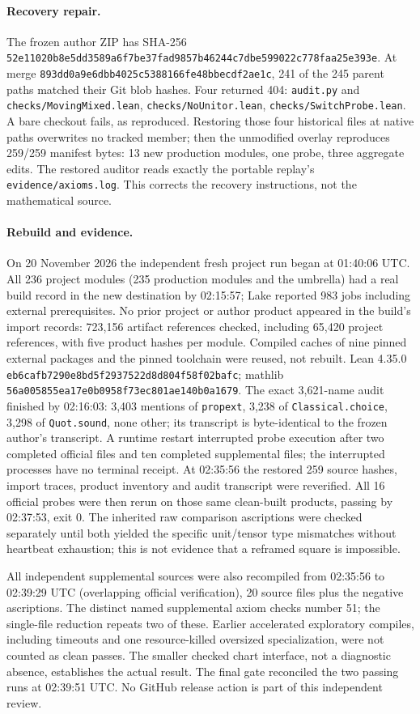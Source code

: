 \documentclass[10pt]{article}
\newcommand{\code}{\nolinkurl}\setlength{\emergencystretch}{3em}
\begin{document}
\paragraph{Recovery repair.} The frozen author ZIP has SHA-256 \code{52e11020b8e5dd3589a6f7be37fad9857b46244c7dbe599022c778faa25e393e}. At merge \code{893dd0a9e6dbb4025c5388166fe48bbecdf2ae1c}, 241 of the 245 parent paths matched their Git blob hashes. Four returned 404: \code{audit.py} and \code{checks/MovingMixed.lean}, \code{checks/NoUnitor.lean}, \code{checks/SwitchProbe.lean}. A bare checkout fails, as reproduced. Restoring those four historical files at native paths overwrites no tracked member; then the unmodified overlay reproduces 259/259 manifest bytes: 13 new production modules, one probe, three aggregate edits. The restored auditor reads exactly the portable replay's \code{evidence/axioms.log}. This corrects the recovery instructions, not the mathematical source.
\paragraph{Rebuild and evidence.} On 20 November 2026 the independent fresh project run began at 01:40:06 UTC. All 236 project modules (235 production modules and the umbrella) had a real build record in the new destination by 02:15:57; Lake reported 983 jobs including external prerequisites. No prior project or author product appeared in the build's import records: 723,156 artifact references checked, including 65,420 project references, with five product hashes per module. Compiled caches of nine pinned external packages and the pinned toolchain were reused, not rebuilt. Lean 4.35.0 \code{eb6cafb7290e8bd5f2937522d8d804f58f02bafc}; mathlib \code{56a005855ea17e0b0958f73ec801ae140b0a1679}. The exact 3,621-name audit finished by 02:16:03: 3,403 mentions of \code{propext}, 3,238 of \code{Classical.choice}, 3,298 of \code{Quot.sound}, none other; its transcript is byte-identical to the frozen author's transcript. A runtime restart interrupted probe execution after two completed official files and ten completed supplemental files; the interrupted processes have no terminal receipt. At 02:35:56 the restored 259 source hashes, import traces, product inventory and audit transcript were reverified. All 16 official probes were then rerun on those same clean-built products, passing by 02:37:53, exit 0. The inherited raw comparison ascriptions were checked separately until both yielded the specific unit/tensor type mismatches without heartbeat exhaustion; this is not evidence that a reframed square is impossible.
\par All independent supplemental sources were also recompiled from 02:35:56 to 02:39:29 UTC (overlapping official verification), 20 source files plus the negative ascriptions. The distinct named supplemental axiom checks number 51; the single-file reduction repeats two of these. Earlier accelerated exploratory compiles, including timeouts and one resource-killed oversized specialization, were not counted as clean passes. The smaller checked chart interface, not a diagnostic absence, establishes the actual result. The final gate reconciled the two passing runs at 02:39:51 UTC. No GitHub release action is part of this independent review.
\end{document}
